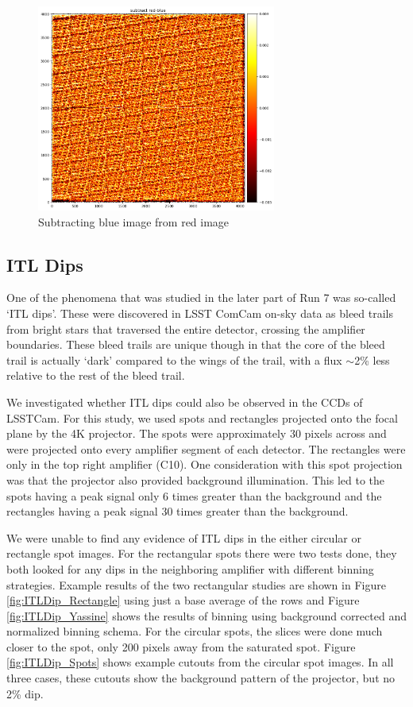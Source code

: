 \begin{figure}[ht]
\centering
\includegraphics[width=0.7\textwidth]{figures/subtract_red_blue.png}
\caption{Subtracting blue image from red image}
\label{fig:tree_ring_subtract_red_blue}
\end{figure}

\clearpage
\subsection{ITL Dips}\label{itl-dips}

One of the phenomena that was studied in the later part of Run 7 was so-called 
`ITL dips'. These were discovered in LSST ComCam on-sky data as
bleed trails from bright stars that traversed the entire detector,
crossing the amplifier boundaries. These bleed trails are unique
though in that the core of the bleed trail is actually `dark'
compared to the wings of the trail, with a flux $\sim$2\% less relative to the rest of the
bleed trail.

We investigated whether ITL dips could also be observed in the CCDs of
LSSTCam. For this study, we used spots and rectangles projected onto the focal plane by the 4K
projector. The spots were approximately 30 pixels across
and were projected onto every amplifier segment of each detector. The rectangles were only
in the top right amplifier (C10). One consideration with this spot
projection was that the projector also provided background illumination. This led to the spots having a peak signal only 6 times greater
than the background and the rectangles having a peak signal 30 times greater
than the background.

We were unable to find any evidence of ITL
dips in the either circular or rectangle spot images. For the rectangular spots there were two tests done, they both looked for any dips in the neighboring amplifier with different binning strategies. Example results of the two rectangular studies are shown in Figure \ref{fig:ITLDip_Rectangle} using just a base average of the rows and Figure \ref{fig:ITLDip_Yassine} shows the results of binning using background corrected and normalized binning schema. For the circular spots, the slices were done much closer to the spot, only 200 pixels away from the saturated spot. Figure \ref{fig:ITLDip_Spots} shows example cutouts from the circular spot images. In all three cases, these cutouts show the background
pattern of the projector, but no 2\% dip.


